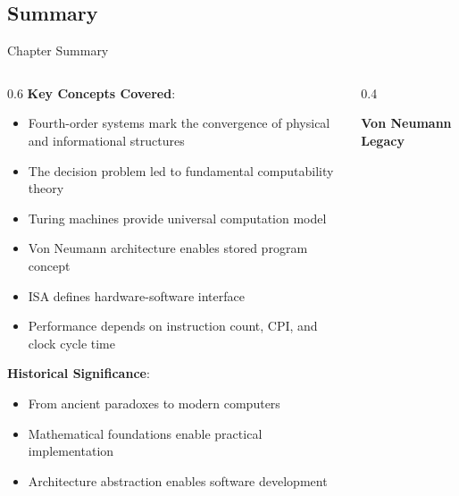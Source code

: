\documentclass[aspectratio=169]{beamer}
\newcommand{\concept}[1]{\textbf{\color{darkblue}#1}}
\begin{document}
\subsection{Summary}

\begin{frame}{Chapter Summary}
\begin{columns}
\begin{column}{0.6\textwidth}
\concept{Key Concepts Covered}:
\begin{itemize}
\item Fourth-order systems mark the convergence of physical and informational structures
\item The decision problem led to fundamental computability theory
\item Turing machines provide universal computation model
\item Von Neumann architecture enables stored program concept
\item ISA defines hardware-software interface
\item Performance depends on instruction count, CPI, and clock cycle time
\end{itemize}

\vspace{0.3cm}
\concept{Historical Significance}:
\begin{itemize}
\item From ancient paradoxes to modern computers
\item Mathematical foundations enable practical implementation
\item Architecture abstraction enables software development
\end{itemize}
\end{column}
\begin{column}{0.4\textwidth}
\begin{center}
\textbf{Von Neumann Legacy}
\vspace{0.3cm}

\end{center}
\end{column}
\end{columns}
\end{frame}
\end{document}
